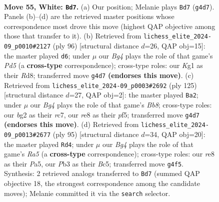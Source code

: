 \documentclass[11pt]{article}
\begin{document}
\clearpage

\begin{figure}[p]\centering
\begin{subfigure}{0.46\textwidth}\centering
\resizebox{\linewidth}{!}{%
\newchessgame
\chessboard[
  setfen={4r3/5pk1/6p1/1R6/6BP/1P6/2r3b1/R5K1 w - - 0 55},
  showmover=false,
  pgfstyle=straightmove, color=movearrow, markmove={g4-d7}
]}
\caption{}
\end{subfigure}\hfill
\begin{subfigure}{0.46\textwidth}\centering
\resizebox{\linewidth}{!}{%
\newchessgame
\chessboard[
  setfen={3R4/1r1b1p2/5kp1/3P4/7P/8/8/3R1K2 w - - 1 49},
  showmover=false,
  pgfstyle=straightmove, color=movearrow, markmove={d5-d6}
]}
\caption{}
\end{subfigure}
\\[4pt]
\begin{subfigure}{0.46\textwidth}\centering
\resizebox{\linewidth}{!}{%
\newchessgame
\chessboard[
  setfen={3r2k1/2R5/5R2/p4Pp1/3P4/4PK2/8/rb6 b - - 9 63},
  showmover=false,
  pgfstyle=straightmove, color=movearrow, markmove={b1-a2}
]}
\caption{}
\end{subfigure}\hfill
\begin{subfigure}{0.46\textwidth}\centering
\resizebox{\linewidth}{!}{%
\newchessgame
\chessboard[
  setfen={8/3R1Bk1/6p1/p1b5/r4P2/6P1/6K1/8 b - - 0 48},
  showmover=false,
  pgfstyle=straightmove, color=movearrow, markmove={a4-d4}
]}
\caption{}
\end{subfigure}
\caption{\textbf{Move 55, White: \texttt{Bd7}.} (a) Our position; Melanie plays \texttt{Bd7} (\texttt{g4d7}). Panels (b)--(d) are the retrieved master positions whose correspondence most drove this move (highest QAP objective among those that transfer to it). (b) Retrieved from \texttt{lichess\_elite\_2024-09\_p0010\#2127} (ply 96) [structural distance $d$=26, QAP obj=15]: the master played \texttt{d6}; under $\mu$ our \emph{Bg4} plays the role of that game's \emph{Pd5} (a \textbf{cross-type} correspondence); cross-type roles: our \emph{K}g1 as their \emph{R}d8; transferred move \texttt{g4d7} \textbf{(endorses this move)}. (c) Retrieved from \texttt{lichess\_elite\_2024-09\_p0003\#2692} (ply 125) [structural distance $d$=27, QAP obj=2]: the master played \texttt{Ba2}; under $\mu$ our \emph{Bg4} plays the role of that game's \emph{Bb8}; cross-type roles: our \emph{b}g2 as their \emph{r}c7, our \emph{r}e8 as their \emph{p}f5; transferred move \texttt{g4d7} \textbf{(endorses this move)}. (d) Retrieved from \texttt{lichess\_elite\_2024-09\_p0013\#2677} (ply 95) [structural distance $d$=34, QAP obj=20]: the master played \texttt{Rd4}; under $\mu$ our \emph{Bg4} plays the role of that game's \emph{Ra5} (a \textbf{cross-type} correspondence); cross-type roles: our \emph{r}e8 as their \emph{P}a5, our \emph{P}b3 as their \emph{B}c5; transferred move \texttt{g4f5}. Synthesis: 2 retrieved analogs transferred to \texttt{Bd7} (summed QAP objective 18, the strongest correspondence among the candidate moves); Melanie committed it via the \texttt{search} selector.}
\label{fig:thought-m108}
\end{figure}
\end{document}
